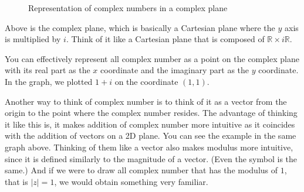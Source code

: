 \documentclass[12pt]{book}
\newcommand{\R}{\mathbb{R}}
\newcommand{\abso}[1]{\left|#1 \right|}
\begin{document}
\begin{figure}[!h]
    \caption{Representation of complex numbers in a complex plane}
    \label{fig:1.1}
\end{figure}

Above is the complex plane, which is basically a Cartesian plane where the $y$ axis is multiplied by $i$. Think of it like a Cartesian plane that is composed of $\R \times i\R$.

You can effectively represent all complex number as a point on the complex plane with its real part as the $x$ coordinate and the imaginary part as the $y$ coordinate. In the graph, we plotted $1+i$ on the coordinate $(1,1)$.

Another way to think of complex number is to think of it as a vector from the origin to the point where the complex number resides. The advantage of thinking it like this is, it makes addition of complex number more intuitive as it coincides with the addition of vectors on a 2D plane. You can see the example in the same graph above. 
\newpage
Thinking of them like a vector also makes modulus more intuitive, since it is defined similarly to the magnitude of a vector. (Even the symbol is the same.) And if we were to draw all complex number that has the modulus of $1$, that is $\abso{z} = 1$, we would obtain something very familiar.
\end{document}
